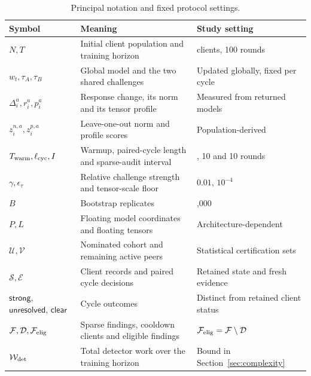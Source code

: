 \documentclass[journal]{IEEEtran}
\begin{document}
\begin{table}[t]\centering\footnotesize
\renewcommand{\arraystretch}{1.05}
\caption{Principal notation and fixed protocol settings.}\label{tab:notation-settings}
\begin{tabular}{>{\raggedright\arraybackslash}p{3.1cm}>{\raggedright\arraybackslash}p{8.0cm}>{\raggedright\arraybackslash}p{4.8cm}}\toprule
Symbol & Meaning & Study setting \\ \midrule
$N,T$ & Initial client population and training horizon & 100 clients, 100 rounds \\
$w_t,\tau_A,\tau_B$ & Global model and the two shared challenges & Updated globally, fixed per cycle \\
$\Delta_i^a,r_i^a,p_i^a$ & Response change, its norm and its tensor profile & Measured from returned models \\
$z_i^{n,a},z_i^{p,a}$ & Leave-one-out norm and profile scores & Population-derived \\
$T_{\rm warm},\ell_{\rm cyc},I$ & Warmup, paired-cycle length and sparse-audit interval & 10, 10 and 10 rounds \\
$\gamma,\epsilon_\tau$ & Relative challenge strength and tensor-scale floor & $0.01$, $10^{-4}$ \\
$B$ & Bootstrap replicates & 1,000 \\
$P,L$ & Floating model coordinates and floating tensors & Architecture-dependent \\
$\mathcal U,\mathcal V$ & Nominated cohort and remaining active peers & Statistical certification sets \\
$\mathcal S,\mathcal E$ & Client records and paired cycle decisions & Retained state and fresh evidence \\
$\mathsf{strong}$, $\mathsf{unresolved}$, $\mathsf{clear}$ & Cycle outcomes & Distinct from retained client status \\
$\mathcal F,\mathcal D,\mathcal F_{\rm elig}$ & Sparse findings, cooldown clients and eligible findings & $\mathcal F_{\rm elig}=\mathcal F\setminus\mathcal D$ \\
$\mathcal W_{\rm det}$ & Total detector work over the training horizon & Bound in Section~\ref{sec:complexity} \\
\bottomrule\end{tabular}
\end{table}

\end{document}
